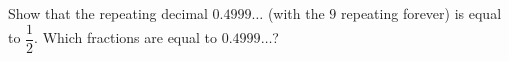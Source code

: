 Show that the repeating decimal $0.4999\ldots$ (with the $9$ repeating forever) is equal to $\dfrac12$. Which fractions are equal to $0.4999\ldots$?
